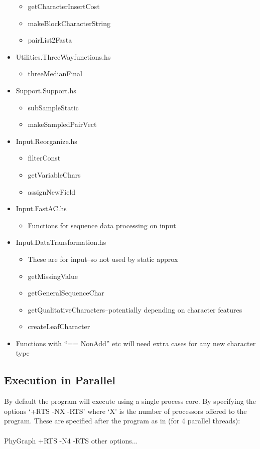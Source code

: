 \documentclass[11pt]{article}
\begin{document}
\begin{itemize}
				\begin{itemize}
					\item{getCharacterInsertCost}
					\item{makeBlockCharacterString}
					\item{pairList2Fasta}
				\end{itemize}
			 \item{Utilities.ThreeWayfunctions.hs}
				\begin{itemize}
					\item{threeMedianFinal}
				\end{itemize}
			 \item{Support.Support.hs}
				\begin{itemize}
					\item{subSampleStatic}
					\item{makeSampledPairVect}
				\end{itemize}
			 \item{Input.Reorganize.hs}
			 \begin{itemize}
			 	\item{filterConst}
			 	\item{getVariableChars}
			 	\item{assignNewField}
			 \end{itemize}
		 	  \item{Input.FastAC.hs}
		 	 \begin{itemize}
		 	 	\item{Functions for sequence data processing on input}
		 	 \end{itemize}
		 	 \item{Input.DataTransformation.hs}
		 	 \begin{itemize}
		 	 	\item{These are for input--so not used by static approx}
		 	 	\item{getMissingValue}
		 	 	\item{getGeneralSequenceChar}
		 	 	\item{getQualitativeCharacters--potentially depending on character features}
		 	 	\item{createLeafCharacter}
		 	 \end{itemize}
		 	 
			 \item{Functions with ``== NonAdd'' etc will need extra cases for any new character type}
	\end{itemize}
	\subsection{Execution in Parallel}
	By default the program will execute using a single process core.  By specifying the options `+RTS -NX -RTS' where `X' is the number of processors offered to the program. These are specified after the program as in (for 4 parallel threads):\\
	\\
	PhyGraph +RTS -N4 -RTS other options...  \\
	
\end{document}
